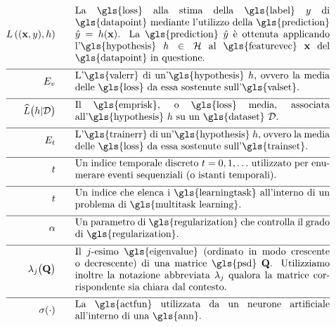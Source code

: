 \begin{align}
\lossfunc{(\featurevec,\truelabel)}{\hypothesis}  \quad\quad & \parbox{.75\textwidth}{La \gls{loss} alla stima della
		\gls{label} $\truelabel$ di \gls{datapoint} mediante l'utilizzo della \gls{prediction} $\hat{\truelabel}=h(\featurevec)$. La 
		\gls{prediction} $\hat{\truelabel}$ è ottenuta applicando l'\gls{hypothesis} $\hypothesis \in \hypospace$ al \gls{featurevec} $\featurevec$ del \gls{datapoint} in questione.}    \nonumber  \nonumber \\[2mm] \hline \nonumber\\[-5mm] 
	\valerror \quad\quad &\parbox{.75\textwidth}{L'\gls{valerr} di un'\gls{hypothesis} $\hypothesis$, ovvero la media delle \gls{loss} da essa sostenute sull'\gls{valset}.}  \nonumber \\[2mm] \hline \nonumber\\[-5mm]
	\emperror\big(\hypothesis| \dataset \big) \quad\quad &\parbox{.75\textwidth}{Il \gls{emprisk}, o \gls{loss} media, 
		associata all'\gls{hypothesis} $\hypothesis$ su un \gls{dataset} $\dataset$.} \nonumber \\[2mm] \hline \nonumber\\[-5mm]
	\trainerror \quad\quad &\parbox{.75\textwidth}{L'\gls{trainerr} di un'\gls{hypothesis} $\hypothesis$, ovvero la media delle \gls{loss} da essa sostenute sull'\gls{trainset}. }\nonumber \\[2mm] \hline \nonumber\\[-5mm]
	\timeidx \quad\quad &\parbox{.75\textwidth}{Un indice temporale discreto $\timeidx=0,1,\ldots$ utilizzato per enumerare eventi sequenziali (o istanti temporali). }\nonumber \\[2mm] \hline \nonumber\\[-5mm]
	\taskidx \quad\quad &\parbox{.75\textwidth}{Un indice che elenca i
		\gls{learningtask} all'interno di un problema di \gls{multitask learning}.}\nonumber \\[2mm] \hline \nonumber\\[-5mm]
	\regparam \quad\quad &\parbox{.75\textwidth}{Un parametro di \gls{regularization} che controlla il grado di \gls{regularization}. } \nonumber \\[2mm] \hline \nonumber\\[-5mm]
	\eigval{\featureidx}\big( \mathbf{Q} \big) \quad\quad &\parbox{.75\textwidth}{Il $\featureidx$-esimo 
		\gls{eigenvalue} (ordinato in modo crescente o decrescente) di una matrice \gls{psd} $\mathbf{Q}$. Utilizziamo inoltre la notazione abbreviata $\eigval{\featureidx}$ qualora la matrice corrispondente sia chiara dal contesto. }\nonumber \\[2mm] \hline \nonumber\\[-5mm]
	\actfun(\cdot) \quad\quad &\parbox{.75\textwidth}{La \gls{actfun} utilizzata da un neurone artificiale all'interno di una \gls{ann}.}\nonumber %
\end{align}              


